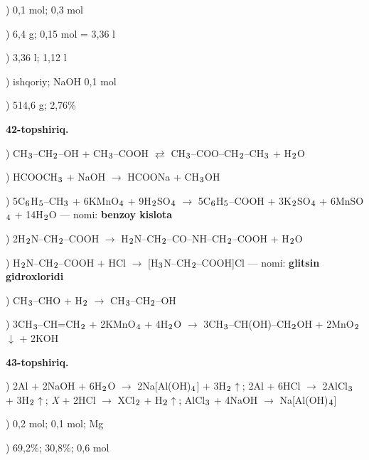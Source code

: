\documentclass[11pt,a4paper]{article}
\renewcommand{\textsubscript}[1]{\ensuremath{_{\text{\fontsize{8}{8}\selectfont #1}}}}
\begin{document}
) 0,1 mol; 0,3 mol\par
{}) 6,4 g; 0,15 mol = 3,36 l\par
{}) 3,36 l; 1,12 l\par
{}) ishqoriy; NaOH 0,1 mol\par
{}) 514,6 g; 2,76\%\par
\noindent\textbf{42-topshiriq.}\par
{}) CH\textsubscript{3}--CH\textsubscript{2}--OH + CH\textsubscript{3}--COOH $\rightleftarrows$ CH\textsubscript{3}--COO--CH\textsubscript{2}--CH\textsubscript{3} + H\textsubscript{2}O\par
{}) HCOOCH\textsubscript{3} + NaOH $\to$ HCOONa + CH\textsubscript{3}OH\par
{}) 5C\textsubscript{6}H\textsubscript{5}--CH\textsubscript{3} + 6KMnO\textsubscript{4} + 9H\textsubscript{2}SO\textsubscript{4} $\to$ 5C\textsubscript{6}H\textsubscript{5}--COOH + 3K\textsubscript{2}SO\textsubscript{4} + 6MnSO\textsubscript{4} + 14H\textsubscript{2}O --- nomi: \textbf{benzoy kislota}\par
{}) 2H\textsubscript{2}N--CH\textsubscript{2}--COOH $\to$ H\textsubscript{2}N--CH\textsubscript{2}--CO--NH--CH\textsubscript{2}--COOH + H\textsubscript{2}O\par
{}) H\textsubscript{2}N--CH\textsubscript{2}--COOH + HCl $\to$ [H\textsubscript{3}N--CH\textsubscript{2}--COOH]Cl --- nomi: \textbf{glitsin gidroxloridi}\par
{}) CH\textsubscript{3}--CHO + H\textsubscript{2} $\to$ CH\textsubscript{3}--CH\textsubscript{2}--OH\par
{}) 3CH\textsubscript{3}--CH=CH\textsubscript{2} + 2KMnO\textsubscript{4} + 4H\textsubscript{2}O $\to$ 3CH\textsubscript{3}--CH(OH)--CH\textsubscript{2}OH + 2MnO\textsubscript{2}$\downarrow$ + 2KOH\par
\noindent\textbf{43-topshiriq.}\par
{}) 2Al + 2NaOH + 6H\textsubscript{2}O $\to$ 2Na[Al(OH)\textsubscript{4}] + 3H\textsubscript{2}$\uparrow$; 2Al + 6HCl $\to$ 2AlCl\textsubscript{3} + 3H\textsubscript{2}$\uparrow$; \textit{X} + 2HCl $\to$ XCl\textsubscript{2} + H\textsubscript{2}$\uparrow$; AlCl\textsubscript{3} + 4NaOH $\to$ Na[Al(OH)\textsubscript{4}]\par
{}) 0,2 mol; 0,1 mol; Mg\par
{}) 69,2\%; 30,8\%; 0,6 mol\par
\end{document}
